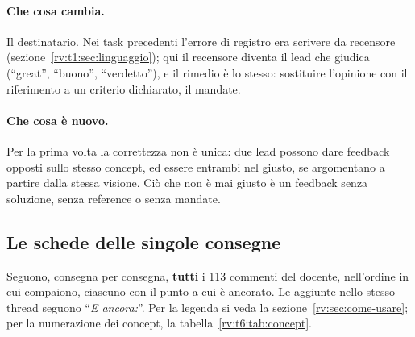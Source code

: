 \paragraph{Che cosa cambia.} Il destinatario. Nei task precedenti l'errore di
registro era scrivere da recensore (sezione~\ref{rv:t1:sec:linguaggio}); qui
il recensore diventa il lead che giudica (``great'', ``buono'', ``verdetto''),
e il rimedio è lo stesso: sostituire l'opinione con il riferimento a un
criterio dichiarato, il mandate.

\paragraph{Che cosa è nuovo.} Per la prima volta la correttezza non è unica:
due lead possono dare feedback opposti sullo stesso concept, ed essere
entrambi nel giusto, se argomentano a partire dalla stessa visione. Ciò che
non è mai giusto è un feedback senza soluzione, senza reference o senza
mandate.

\subsection{Le schede delle singole consegne}
\label{rv:t6:sec:schede}

Seguono, consegna per consegna, \textbf{tutti} i 113 commenti del docente,
nell'ordine in cui compaiono, ciascuno con il punto a cui è ancorato. Le
aggiunte nello stesso thread seguono ``\emph{E ancora:}''. Per la legenda si
veda la sezione~\ref{rv:sec:come-usare}; per la numerazione dei concept, la
tabella~\ref{rv:t6:tab:concept}.

